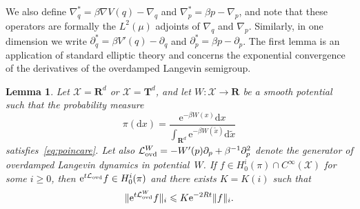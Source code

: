 \documentclass[11pt,a4paper]{article}
\newcommand{\e}{\mathrm{e}}
\newcommand{\real}{\mathbf R}
\newcommand{\torus}{\mathbf T}
\renewcommand{\d}{\mathrm d}
\theoremstyle{plain}
\newtheorem{lemma}{Lemma}[section]
\numberwithin{equation}{section}
\renewcommand{\leq}{\leqslant}
\renewcommand{\geq}{\geqslant}
\begin{document}
We also define $\nabla_q^* = \beta \nabla V(q) - \nabla_q$ and $\nabla_p^* = \beta p - \nabla_p$,
and note that these operators are formally the $L^2(\mu)$ adjoints of $\nabla_q$ and $\nabla_p$.
Similarly, in one dimension we write $\partial_q^* = \beta V'(q) - \partial_q$ and $\partial_p^* = \beta p - \partial_p$.
The first lemma is an application of standard elliptic theory and
concerns the exponential convergence of the derivatives of the overdamped Langevin semigroup.
\begin{lemma}
    \label{lemma:overdamped_langevin_decay_derivatives}
    Let $\mathcal X = \real^d$ or $\mathcal X = \torus^d$,
    and let $W: \mathcal X \to \real$ be a smooth potential such that the probability measure
    \[
        \pi(\d x) = \frac{\e^{- \beta W(x)} \d x}{\int_{\real^d} \e^{-\beta W(\widetilde x)} \d \widetilde x}
    \]
    satisfies~\eqref{eq:poincare}.
    Let also $\mathcal L_{\rm ovd}^W = - W'(p) \partial_p + \beta^{-1} \partial_p^2$ denote the generator of overdamped Langevin dynamics in potential~$W$.
    If $f \in H^i_0(\pi) \cap C^{\infty}(\mathcal X)$ for some $i \geq 0$,
    then $\e^{t \mathcal L_{\rm ovd}} f \in H^i_0(\pi)$ and there exists $K = K(i)$ such that
    \[
        \norm*{\e^{t \mathcal L_{\rm ovd}^W} f}_i \leq K \e^{- 2 R t} \norm*{f}_i.
    \]
\end{lemma}
\end{document}
